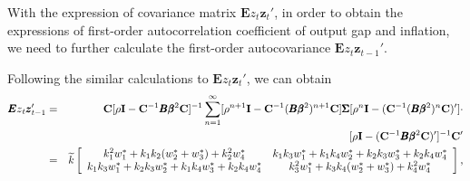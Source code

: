 \begin{appendix}
With the expression of covariance matrix ${\pmb E z}_{t}{\pmb z}_t'$,
in order to obtain the expressions of first-order autocorrelation
coefficient of output gap and inflation, we need to further calculate
the first-order autocovariance ${\pmb Ez}_{t}{\pmb z}_{t-1}'$.

Following the similar calculations to ${\pmb E z}_{t}{\pmb z}_t'$, we can obtain
\begin{eqnarray*}\label{modeln31}
   {\pmb Ez}_{t}{\pmb z}_{t-1}'
     &=&    {\bf C}[\rho
         {\bf I}-{\bf C}^{-1}\pmb {B\beta}^2{\bf C}]^{-1}\sum_{n=1}^\infty[\rho^{n+1}
        {\bf I}-{\bf C}^{-1}(\pmb {B\beta}^2)^{n+1}{\bf C}]{\pmb\Sigma}[\rho^{n}{\bf I}-({\bf C}^{-1}(\pmb {B\beta}^2)^{n}{\bf C})']\cdot\nonumber\\
        &&[\rho
         {\bf I}-({\bf C}^{-1}\pmb {B\beta}^2{\bf C})']^{-1} {\bf C}'\nonumber\\
         &=&\widetilde{k}\left[\begin{array}{cc}
k_1^2w_1^*+k_1k_2(w_2^*+w_3^*)+k_2^2w_4^*&k_1k_3w_1^*+k_1k_4w_2^*+k_2k_3w_3^*+k_2k_4w_4^*\\
k_1k_3w_1^*+k_2k_3w_2^*+k_1k_4w_3^*+k_2k_4w_4^*&k_3^2w_1^*+k_3k_4(w_2^*+w_3^*)+k_4^2w_4^*
\end{array}\right],
\end{eqnarray*}





\end{appendix}
